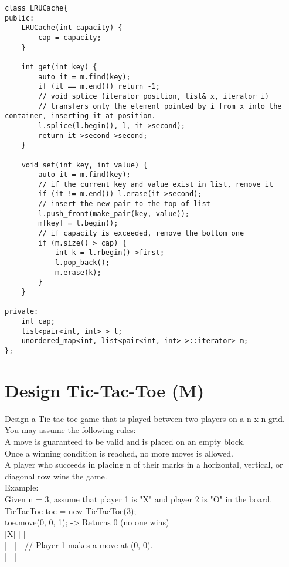 \begin{lstlisting}
class LRUCache{
public:
    LRUCache(int capacity) {
        cap = capacity;
    }
    
    int get(int key) {
        auto it = m.find(key);
        if (it == m.end()) return -1;
        // void splice (iterator position, list& x, iterator i)
        // transfers only the element pointed by i from x into the container, inserting it at position.
        l.splice(l.begin(), l, it->second);
        return it->second->second;
    }
    
    void set(int key, int value) {
        auto it = m.find(key);
        // if the current key and value exist in list, remove it
        if (it != m.end()) l.erase(it->second);
        // insert the new pair to the top of list
        l.push_front(make_pair(key, value)); 
        m[key] = l.begin();
        // if capacity is exceeded, remove the bottom one
        if (m.size() > cap) {
            int k = l.rbegin()->first;
            l.pop_back();
            m.erase(k);
        }
    }
    
private:
    int cap;
    list<pair<int, int> > l;
    unordered_map<int, list<pair<int, int> >::iterator> m;
};
\end{lstlisting}


\section{Design Tic-Tac-Toe (M)}
Design a Tic-tac-toe game that is played between two players on a n x n grid. \\

You may assume the following rules:\\
A move is guaranteed to be valid and is placed on an empty block.\\
Once a winning condition is reached, no more moves is allowed.\\
A player who succeeds in placing n of their marks in a horizontal, vertical, or diagonal row wins the game.\\

Example:\\
Given n = 3, assume that player 1 is "X" and player 2 is "O" in the board.\\
TicTacToe toe = new TicTacToe(3);\\

toe.move(0, 0, 1); -> Returns 0 (no one wins)\\
|X| | |\\
| | | | // Player 1 makes a move at (0, 0).\\
| | | |\\

